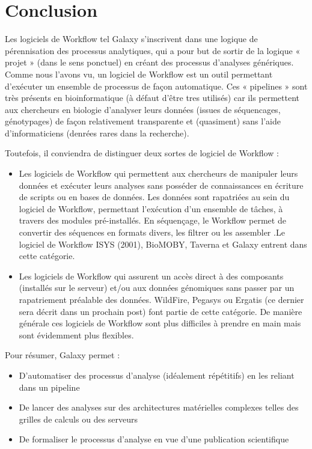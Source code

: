 \chapter*{Conclusion}

Les logiciels de Workflow tel Galaxy s’inscrivent dans une logique de pérennisation des processus analytiques, qui a pour but de sortir de la logique « projet » (dans le sens ponctuel) en créant des processus d’analyses génériques. Comme nous l'avons vu, un logiciel de Workflow est un outil permettant d’exécuter un ensemble de processus de façon automatique. Ces « pipelines » sont très présents en bioinformatique (à défaut d’être tres utilisés) car ils permettent aux chercheurs en biologie d’analyser leurs données (issues de séquencages, génotypages) de façon relativement transparente et (quasiment) sans l’aide d’informaticiens (denrées rares dans la recherche).

Toutefois, il conviendra de distinguer deux sortes de logiciel de Workflow :
\begin{itemize}
\item{Les logiciels de Workflow qui permettent aux chercheurs de manipuler leurs données et exécuter leurs analyses sans posséder de connaissances en écriture de scripts ou en bases de données. Les données sont rapatriées au sein du logiciel de Workflow, permettant l’exécution d’un ensemble de tâches, à travers des modules pré-installés. En séquençage, le Workflow permet de convertir des séquences en formats divers, les filtrer  ou les assembler .Le logiciel de Workflow ISYS (2001), BioMOBY, Taverna et Galaxy entrent dans cette catégorie.}

\item{Les logiciels de Workflow qui assurent un accès direct à des composants (installés sur le serveur) et/ou aux données génomiques sans passer par un rapatriement préalable des données. WildFire, Pegasys ou Ergatis (ce dernier sera décrit dans un prochain post) font partie de cette catégorie. De manière générale ces logiciels de Workflow sont plus difficiles à prendre en main mais sont évidemment plus flexibles.}
\end{itemize}
Pour résumer, Galaxy permet :
\begin{itemize}
\item{D’automatiser des processus d’analyse (idéalement répétitifs) en les reliant dans un pipeline}
\item{De lancer des analyses sur des architectures matérielles complexes telles des grilles de calculs ou des serveurs}
\item{ De formaliser le processus d’analyse en vue d’une publication scientifique}
\end{itemize}